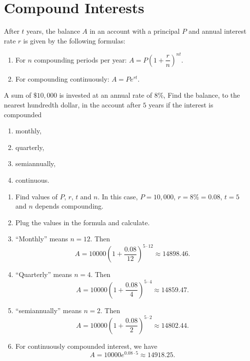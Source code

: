 \documentclass[en,12pt]{elegantbook}
\providecommand{\tightlist}{%
  \setlength{\itemsep}{0pt}\setlength{\parskip}{0pt}}
\providecommand{\tightlist}{%
  \setlength{\itemsep}{0pt}\setlength{\parskip}{0pt}}
\let\BeginKnitrBlock\begin \let\EndKnitrBlock\end
\begin{document}
\hypertarget{compound-interests}{%
\section{Compound Interests}\label{compound-interests}}

After \(t\) years, the balance \(A\) in an account with a principal \(P\) and annual interest rate \(r\) is given by the following formulas:

\begin{enumerate}
\def\labelenumi{\arabic{enumi}.}
\tightlist
\item
  For \(n\) compounding periods per year: \(A=P\left(1+\dfrac{r}{n}\right)^{nt}\).
\item
  For compounding continuously: \(A=Pe^{rt}\).
\end{enumerate}

\BeginKnitrBlock{example}
\protect\hypertarget{exm:unnamed-chunk-277}{}{\label{exm:unnamed-chunk-277} }
A sum of \(\$10,000\) is invested at an annual rate of \(8\%\), Find the balance, to the nearest hundredth dollar, in the account after \(5\) years if the interest is compounded

\begin{enumerate}
\def\labelenumi{\arabic{enumi}.}
\tightlist
\item
  monthly,
\item
  quarterly,
\item
  semiannually,
\item
  continuous.
\end{enumerate}
\EndKnitrBlock{example}

\BeginKnitrBlock{solution}


\begin{enumerate}
\def\labelenumi{\arabic{enumi}.}
\tightlist
\item
  Find values of \(P\), \(r\), \(t\) and \(n\). In this case, \(P=10,000\), \(r=8\%=0.08\), \(t=5\) and \(n\) depends compounding.
\item
  Plug the values in the formula and calculate.
\item
  ``Monthly'' means \(n=12\). Then
  \[
   A=10000\left(1+\frac{0.08}{12}\right)^{5\cdot 12}\approx 14898.46.
   \]
\item
  ``Quarterly'' means \(n=4\). Then
  \[
   A=10000\left(1+\frac{0.08}{4}\right)^{5\cdot 4}\approx 14859.47.
   \]
\item
  ``semiannually'' means \(n=2\). Then
  \[
   A=10000\left(1+\frac{0.08}{2}\right)^{5\cdot 2}\approx 14802.44.
   \]
\item
  For continuously compounded interest, we have
  \[
   A=10000e^{0.08\cdot 5}\approx 14918.25.
   \]
\end{enumerate}
\EndKnitrBlock{solution}
\end{document}
